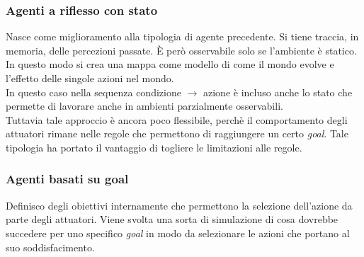 \documentclass[10pt,a4paper]{book}
\begin{document}
\subsubsection{Agenti a riflesso con stato}
Nasce come miglioramento alla tipologia di agente precedente. Si tiene traccia, in memoria, delle percezioni passate. \`E per\`o osservabile solo se l'ambiente \`e statico. In questo modo si crea una mappa come modello di come il mondo evolve e l'effetto delle singole azioni nel mondo.\\
In questo caso nella sequenza condizione $\rightarrow$ azione \`e incluso anche lo stato che permette di lavorare anche in ambienti parzialmente osservabili.\\
Tuttavia tale approccio \`e ancora poco flessibile, perch\`e il comportamento degli attuatori rimane nelle regole che permettono di raggiungere un certo \textit{goal}. Tale tipologia ha portato il vantaggio di togliere le limitazioni alle regole.
\subsubsection{Agenti basati su goal}
Definisco degli obiettivi internamente che permettono la selezione dell'azione da parte degli attuatori. Viene svolta una sorta di simulazione di cosa dovrebbe succedere per uno specifico \textit{goal} in modo da selezionare le azioni che portano al suo soddisfacimento.
\end{document}
